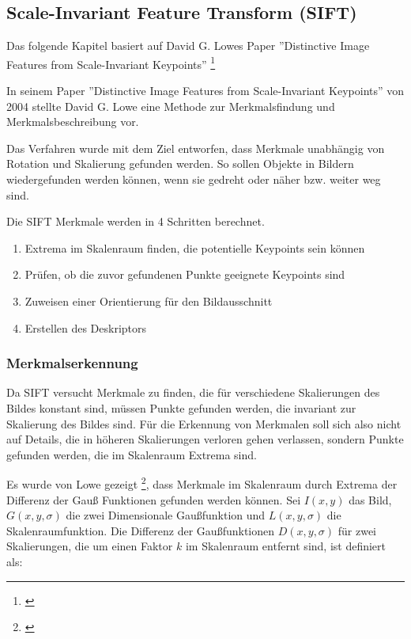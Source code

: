 \subsection{Scale-Invariant Feature Transform (SIFT)}
Das folgende Kapitel basiert auf David G. Lowes Paper ''Distinctive Image Features
from Scale-Invariant Keypoints'' \footnote{\cite{Lowe2004}}

In seinem Paper ''Distinctive Image Features from Scale-Invariant Keypoints'' von 2004 stellte David G. Lowe eine Methode zur Merkmalsfindung und Merkmalsbeschreibung vor.

Das Verfahren wurde mit dem Ziel entworfen, dass Merkmale unabhängig von Rotation und Skalierung gefunden werden. So sollen Objekte in Bildern wiedergefunden werden können, wenn sie gedreht oder näher bzw. weiter weg sind.

Die SIFT Merkmale werden in 4 Schritten berechnet.

\begin{enumerate}

\item Extrema im Skalenraum finden, die potentielle Keypoints sein können
\item Prüfen, ob die zuvor gefundenen Punkte geeignete Keypoints sind
\item Zuweisen einer Orientierung für den Bildausschnitt
\item Erstellen des Deskriptors

\end{enumerate}

\subsubsection{Merkmalserkennung}

Da SIFT versucht Merkmale zu finden, die für verschiedene Skalierungen des Bildes konstant sind, müssen Punkte gefunden werden, die invariant zur Skalierung des Bildes sind.
Für die Erkennung von Merkmalen soll sich also nicht auf Details, die in höheren Skalierungen verloren gehen verlassen, sondern Punkte gefunden werden, die im Skalenraum Extrema sind.

Es wurde von Lowe gezeigt \footnote{\cite{Lowe:1999:ORL:850924.851523}}, dass Merkmale im Skalenraum durch Extrema der Differenz der Gauß Funktionen gefunden werden können.
Sei $I(x, y)$ das Bild, $G(x, y, \sigma)$ die zwei Dimensionale Gaußfunktion  und $L(x, y, \sigma)$ die Skalenraumfunktion.
Die Differenz der Gaußfunktionen $D(x, y, \sigma)$ für zwei Skalierungen, die um einen Faktor $k$ im Skalenraum entfernt sind, ist definiert als:

